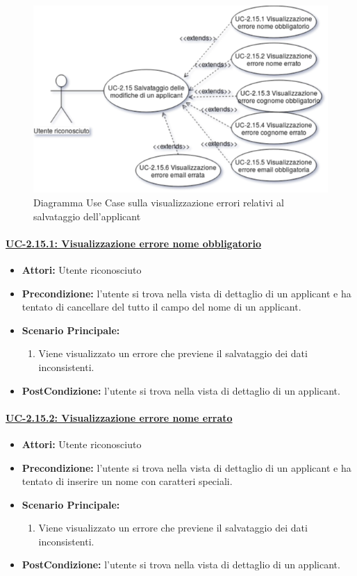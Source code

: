 \begin{figure}[!h] 
	\centering 
	\includegraphics[width=1\columnwidth]{immagini/usecase/UC5} 
	\caption{Diagramma Use Case sulla visualizzazione errori relativi al salvataggio dell'applicant}
	\label{figura:uc-5}
\end{figure}


\paragraph{\underline{UC-2.15.1: Visualizzazione errore nome obbligatorio}}
\begin{itemize}	
	\item \textbf{Attori:} Utente riconosciuto
	\item \textbf{Precondizione:}  l'utente si trova nella vista di dettaglio di un applicant e ha tentato di cancellare del tutto il campo del nome di un applicant.
	\item \textbf{Scenario Principale:}
	\begin{enumerate}
		\item Viene visualizzato un errore che previene il salvataggio dei dati inconsistenti.
	\end{enumerate}
	\item \textbf{PostCondizione:} l'utente si trova nella vista di dettaglio di un applicant.
\end{itemize}

\paragraph{\underline{UC-2.15.2: Visualizzazione errore nome errato}}
\begin{itemize}	
	\item \textbf{Attori:} Utente riconosciuto
	\item \textbf{Precondizione:}  l'utente si trova nella vista di dettaglio di un applicant e ha tentato di inserire un nome con caratteri speciali.
	\item \textbf{Scenario Principale:}
	\begin{enumerate}
		\item Viene visualizzato un errore che previene il salvataggio dei dati inconsistenti.
	\end{enumerate}
	\item \textbf{PostCondizione:} l'utente si trova nella vista di dettaglio di un applicant.
\end{itemize}

